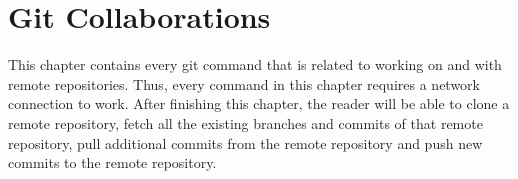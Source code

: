 \chapter{Git Collaborations}
\label{cha:git_collaboration}
This chapter contains every git command that is related to working on and with remote repositories. Thus, every command in this chapter requires a network connection to work. After finishing this chapter, the reader will be able to clone a remote repository, fetch all the existing branches and commits of that remote repository, pull additional commits from the remote repository and push new commits to the remote repository.

\newpage




\newpage




\newpage




\newpage


